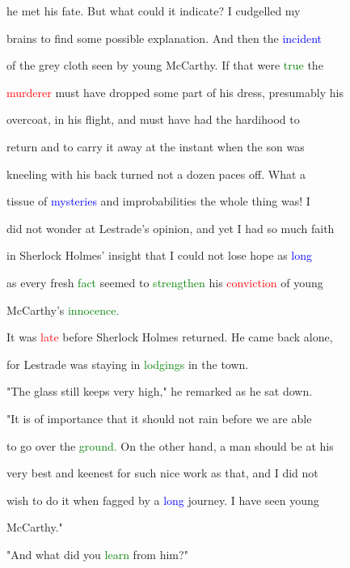  he met his \textcolor{BurntOrange}{fate.} But what could it indicate? I cudgelled my

 brains to find some possible explanation. And then the \textcolor{blue}{incident}

 of the grey cloth seen by \textcolor{BurntOrange}{young} McCarthy. If that were \textcolor{green}{true} the

 \textcolor{red}{murderer} must have dropped some part of his dress, presumably his

 overcoat, in his flight, and must have had the hardihood to

 return and to carry it away at the instant when the son was

 kneeling with his back turned not a dozen paces off. What a

 tissue of \textcolor{blue}{mysteries} and improbabilities the whole thing was! I

 did not wonder at Lestrade's opinion, and yet I had so much \textcolor{BurntOrange}{faith}

 in Sherlock Holmes' insight that I could not \textcolor{BurntOrange}{lose} \textcolor{BurntOrange}{hope} as \textcolor{blue}{long}

 as every fresh \textcolor{green}{fact} seemed to \textcolor{green}{strengthen} his \textcolor{red}{conviction} of \textcolor{BurntOrange}{young}

 McCarthy's \textcolor{green}{innocence.}



 It was \textcolor{red}{late} before Sherlock Holmes returned. He came back alone,

 for Lestrade was staying in \textcolor{green}{lodgings} in the town.



 "The glass still keeps very high," he remarked as he sat down.

 "It is of \textcolor{BurntOrange}{importance} that it should not rain before we are able

 to go over the \textcolor{green}{ground.} On the other hand, a man should be at his

 very best and keenest for such nice work as that, and I did not

 wish to do it when fagged by a \textcolor{blue}{long} \textcolor{BurntOrange}{journey.} I have seen \textcolor{BurntOrange}{young}

 McCarthy."



 "And what did you \textcolor{green}{learn} from him?"




